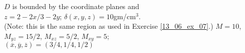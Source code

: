 {$D$ is bounded by the coordinate planes and\\
 $z=2-2x/3-2y$; \quad $\delta(x,y,z) = 10$gm/cm$^3$.\\
(Note: this is the same region as used in Exercise \ref{13_06_ex_07}.)
}
{$M = 10$, $M_{yz} = 15/2$, $M_{xz}=5/2$, $M_{xy}=5$;\\
$(\overline{x},\overline{y},\overline{z}) = (3/4, 1/4, 1/2)$
}
